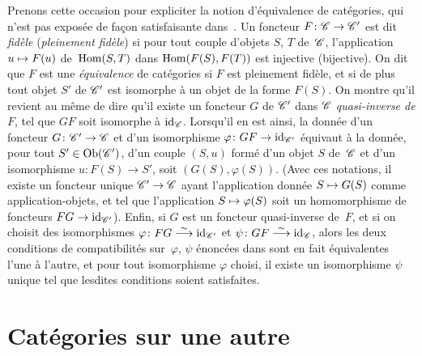 Prenons cette occasion pour expliciter la notion d'\'equivalence de
cat\'egories,
qui n'est pas expos\'ee de fa\c con satisfaisante
dans~\cite{VI.1}. Un foncteur $F\colon\cal{C}\to \cal{C}'$ est dit
\emph{fidèle}
(\resp \emph{pleinement fidèle})
si pour tout couple d'objets $S$, $T$ de~$\cal{C}$, l'application
$u\mto F(u)$ de~$\operatorname{Hom}(S,T)$ dans $\operatorname{Hom}(F(S),F(T))$ est injective
(\resp bijective). On dit que $F$ est une \emph{équivalence} de
cat\'egories si
$F$ est pleinement fid\`ele, et si de plus tout objet $S'$ de
$\cal{C}'$ est isomorphe \`a un objet de la forme $F(S)$. On montre
qu'il revient au m\^eme de dire qu'il existe un foncteur $G$ de
$\cal{C}'$ dans $\cal{C}$ \emph{quasi-inverse de} $F$, \iev tel que
$GF$ soit isomorphe \`a $\id_{\cal{C}}$. Lorsqu'il en est ainsi, la
donn\'ee d'un foncteur $G\colon\cal{C}'\to \cal{C}$ et d'un
isomorphisme $\varphi\colon GF\to \id_{\cal{C}'}$ \'equivaut \`a
la donn\'ee, pour tout $S'\in\Ob(\cal{C}')$, d'un couple $(S,u)$
form\'e d'un objet $S$ de~$\cal{C}$ et d'un isomorphisme $u\colon
F(S)\to S'$, soit $(G(S),\varphi(S))$. (Avec ces notations, il existe
un foncteur unique $\cal{C}'\to\cal{C}$ ayant l'application donn\'ee
$S\mto G(S)$ comme application-objets, et tel que l'application
$S\mto \varphi(S)$ soit un homomorphisme de foncteurs $FG\to
\id_{\cal{C}'}$). Enfin, si $G$ est un foncteur quasi-inverse de~$F$,
et si on choisit des isomorphismes $\varphi\colon
FG\isomto\id_{\cal{C}'}$ et $\psi\colon GF\isomto\id_{\cal{C}}$, alors
les deux conditions de compatibilit\'es sur~$\varphi$, $\psi$
\'enonc\'ees dans \cite[I.1.2]{VI.1} sont en fait \'equivalentes l'une
\`a l'autre, et pour tout isomorphisme $\varphi$ choisi, il existe
un isomorphisme $\psi$ unique tel que lesdites conditions soient
satisfaites.

\section{Cat\'egories sur une autre}
\label{VI.2}

